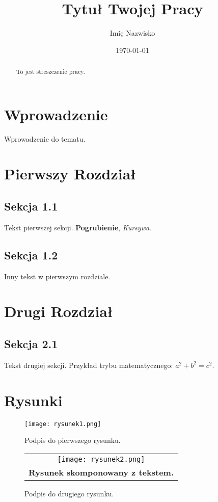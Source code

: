 \documentclass[polski]{article}
\title{Tytuł Twojej Pracy}
\author{Imię Nazwisko}
\date{\today}
\begin{document}
\maketitle

\begin{abstract}
    To jest streszczenie pracy. \lipsum[1]
\end{abstract}

\tableofcontents

\section{Wprowadzenie}
Wprowadzenie do tematu.

\section{Pierwszy Rozdział}
\subsection{Sekcja 1.1}
Tekst pierwszej sekcji. \textbf{Pogrubienie}, \textit{Kursywa}.

\subsection{Sekcja 1.2}
Inny tekst w pierwszym rozdziale.

\section{Drugi Rozdział}
\subsection{Sekcja 2.1}
Tekst drugiej sekcji. Przykład trybu matematycznego: $a^2 + b^2 = c^2$.

\section{Rysunki}
\begin{figure}[h]
    \centering
    \texttt{[image: rysunek1.png]}
    \caption{Podpis do pierwszego rysunku.}
    \label{sec:rysunek1}
\end{figure}

\begin{figure}[h]
    \centering
    \begin{tabular}{c}
        \texttt{[image: rysunek2.png]} \\
        \textbf{Rysunek skomponowany z tekstem.}
    \end{tabular}
    \caption{Podpis do drugiego rysunku.}
    \label{sec:rysunek2}
\end{figure}
\end{document}
